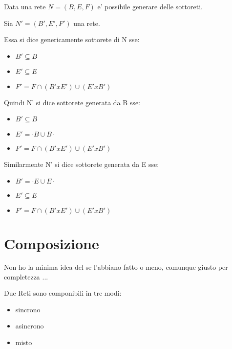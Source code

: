 Data una rete $N = (B, E, F)$ e' possibile generare delle sottoreti.

Sia $N' = (B', E', F')$ una rete.

Essa si dice genericamente sottorete di N sse:
\begin{itemize}
  \item $B' \subseteq B$
  \item $E' \subseteq E$
  \item $F' = F \cap (B' x E') \cup (E' x B')$
\end{itemize}

Quindi N' si dice sottorete generata da B sse:
\begin{itemize}
  \item $B' \subseteq B$
  \item $E' = \cdot B \cup B \cdot$
  \item $F' = F \cap (B' x E') \cup (E' x B')$
\end{itemize}

Similarmente N' si dice sottorete generata da E sse:
\begin{itemize}
  \item $B' = \cdot E \cup E \cdot$
  \item $E' \subseteq E$
  \item $F' = F \cap (B' x E') \cup (E' x B')$
\end{itemize}

\section{Composizione}

Non ho la minima idea del se l'abbiano fatto o meno, comunque giusto per completezza ...

Due Reti sono componibili in tre modi:
\begin{itemize}
  \item sincrono
  \item asincrono
  \item misto
\end{itemize}

